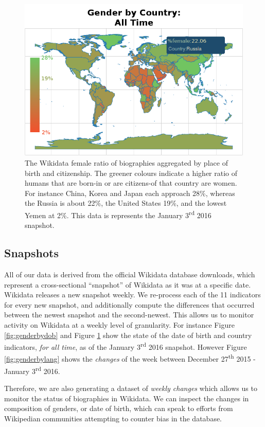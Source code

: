 \documentclass{sig-alternate-05-2015}
\begin{document}
\begin{figure}
\includegraphics[width=\columnwidth]{figures/genderbycountry.png} 
\caption{The Wikidata female ratio of biographies aggregated by place of birth and citizenship. The greener colours indicate a higher ratio of humans that are born-in or are citizens-of that country are women. For instance China, Korea and Japan each approach 28\%, whereas the Russia is about 22\%, the United States 19\%, and the lowest Yemen at 2\%. This data is represents the January 3\textsuperscript{rd} 2016 snapshot.}
\label{fig:genderbycountry}
\end{figure}


\subsection{Snapshots}
All of our data is derived from the official Wikidata database downloads, which represent a cross-sectional ``snapshot'' of Wikidata as it was at a specific date. Wikidata releases a new snapshot weekly. We re-process each of the 11 indicators for every new snapshot, and additionally compute the differences that occurred between the newest snapshot and the second-newest. This allows us to monitor activity on Wikidata at a weekly level of granularity. For instance Figure  \ref{fig:genderbydob} and Figure \ref{fig:genderbycountry} show the state of the date of birth and country indicators, \textit{for all time}, as of the January 3\textsuperscript{rd} 2016 snapshot. However Figure \ref{fig:genderbylang} shows the \textit{changes} of the week between December 27\textsuperscript{th} 2015 - January 3\textsuperscript{rd} 2016.

Therefore, we are also generating a dataset of \textit{weekly changes} which allows us to monitor the status of biographies in Wikidata. We can inspect the changes in composition of genders, or date of birth, which can speak to efforts from Wikipedian communities attempting to counter bias in the database. 
\end{document}

